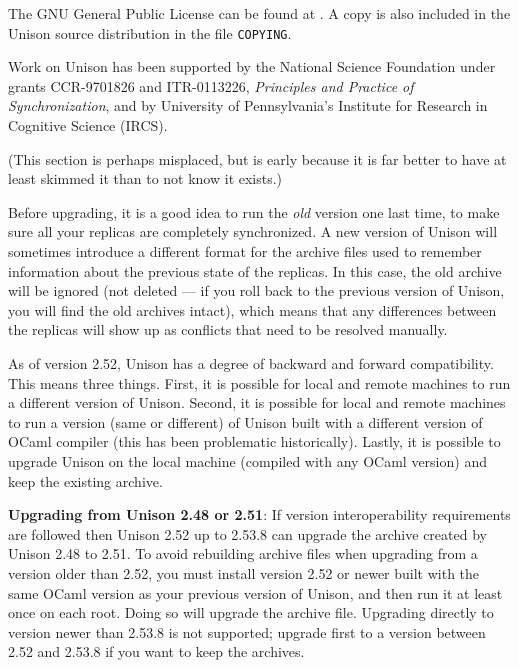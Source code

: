 \documentclass{article}
\begin{document}
    The GNU General Public License can be found at
    .  A copy is also included in the
    Unison source distribution in the file {\tt COPYING}.


Work on Unison has been supported by the National Science Foundation
under grants CCR-9701826 and ITR-0113226, {\em Principles and Practice of
  Synchronization}, and by University of Pennsylvania's Institute for
Research in Cognitive Science (IRCS).



(This section is perhaps misplaced, but is early because it is far
better to have at least skimmed it than to not know it exists.)

Before upgrading, it is a good idea to run the {\em old} version one last
time, to make sure all your replicas are completely synchronized.  A new
version of Unison will sometimes introduce a different format for the
archive files used to remember information about the previous state of the
replicas.  In this case, the old archive will be ignored (not deleted --- if
you roll back to the previous version of Unison, you will find the old
archives intact), which means that any differences between the replicas will
show up as conflicts that need to be resolved manually.

As of version 2.52, Unison has a degree of backward and forward
compatibility.  This means three things.  First, it is possible for local
and remote machines to run a different version of Unison.  Second, it is
possible for local and remote machines to run a version (same or different)
of Unison built with a different version of OCaml compiler (this has been
problematic historically).  Lastly, it is possible to upgrade Unison on
the local machine (compiled with any OCaml version) and keep the existing
archive.

{\bf Upgrading from Unison 2.48 or 2.51}:
If version interoperability requirements are followed then Unison 2.52 up to
2.53.8 can upgrade the archive created by Unison 2.48 to 2.51.  To avoid
rebuilding archive files when upgrading from a version older than 2.52, you
must install version 2.52 or newer built with the same OCaml version as your
previous version of Unison, and then run it at least once on each root.  Doing
so will upgrade the archive file.
Upgrading directly to version newer than 2.53.8 is not supported; upgrade first
to a version between 2.52 and 2.53.8 if you want to keep the archives.
\end{document}
